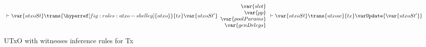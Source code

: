 \begin{figure}
\begin{equation}
{{\begin{array}{r}
        \end{array}
      }
      \vdash \var{utxoSt} \trans{\hyperref[fig:rules:utxo-shelley]{utxo}}{tx}
      \var{utxoSt'}\\
    }
    {
      \begin{array}{r}
        \var{slot}\\
        \var{pp}\\
        \var{poolParams}\\
        \var{genDelegs}\\
      \end{array}
      \vdash \var{utxoSt} \trans{utxow}{tx} \varUpdate{\var{utxoSt'}}
    }
  \end{equation}
  \caption{UTxO with witnesses inference rules for Tx}
  \label{fig:rules:utxow-babbage}
\end{figure}
